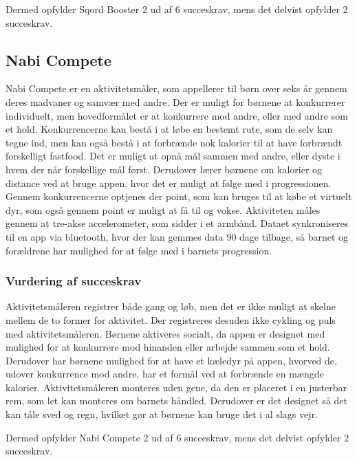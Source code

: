Dermed opfylder Sqord Booster 2 ud af 6 succeskrav, mens det delvist opfylder 2 succeskrav.

\subsection{Nabi Compete}
Nabi Compete er en aktivitetsmåler, som appellerer til børn over seks år gennem deres madvaner og samvær med andre. Der er muligt for børnene at konkurrerer individuelt, men hovedformålet er at konkurrere mod andre, eller med andre som et hold. Konkurrencerne kan bestå i at løbe en bestemt rute, som de selv kan tegne ind, men kan også bestå i at forbrænde nok kalorier til at have forbrændt forskelligt fastfood. Det er muligt at opnå mål sammen med andre, eller dyste i hvem der når forskellige mål først. Derudover lærer børnene om kalorier og distance ved at bruge appen, hvor det er muligt at følge med i progressionen. Gennem konkurrencerne optjenes der point, som kan bruges til at købe et virtuelt dyr, som også gennem point er muligt at få til og vokse. 
Aktiviteten måles gennem at tre-akse accelerometer, som sidder i et armbånd. Dataet synkroniseres til en app via bluetooth, hvor der kan gemmes data 90 dage tilbage, så barnet og forældrene har mulighed for at følge med i barnets progression. \citep{Fuhu_tech2015,Fuhu2015} 

\subsubsection{Vurdering af succeskrav}
Aktivitetsmåleren registrer både gang og løb, men det er ikke muligt at skelne mellem de to former for aktivitet. Der registreres desuden ikke cykling og puls med aktivitetsmåleren. 
Børnene aktiveres socialt, da appen er designet med mulighed for at konkurrere mod hinanden eller arbejde sammen som et hold. Derudover har børnene mulighed for at have et kæledyr på appen, hvorved de, udover konkurrence mod andre, har et formål ved at forbrænde en mængde kalorier. Aktivitetsmåleren monteres uden gene, da den er placeret i en justerbar rem, som let kan monteres om barnets håndled. Derudover er det designet så det kan tåle sved og regn, hvilket gør at børnene kan bruge det i al slags vejr. 

Dermed opfylder Nabi Compete 2 ud af 6 succeskrav, mens det delvist opfylder 2 succeskrav.


